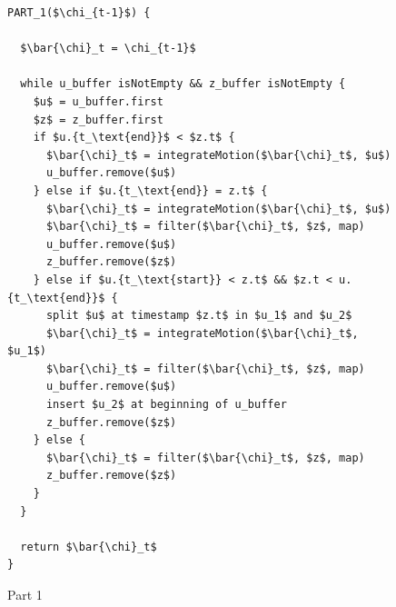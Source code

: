 \begin{figure}
\begin{lstlisting}[mathescape]
PART_1($\chi_{t-1}$) {

  $\bar{\chi}_t = \chi_{t-1}$

  while u_buffer isNotEmpty && z_buffer isNotEmpty {
    $u$ = u_buffer.first
    $z$ = z_buffer.first
    if $u.{t_\text{end}}$ < $z.t$ {
      $\bar{\chi}_t$ = integrateMotion($\bar{\chi}_t$, $u$)
      u_buffer.remove($u$)
    } else if $u.{t_\text{end}} = z.t$ {
      $\bar{\chi}_t$ = integrateMotion($\bar{\chi}_t$, $u$)
      $\bar{\chi}_t$ = filter($\bar{\chi}_t$, $z$, map)
      u_buffer.remove($u$)
      z_buffer.remove($z$)
    } else if $u.{t_\text{start}} < z.t$ && $z.t < u.{t_\text{end}}$ {
      split $u$ at timestamp $z.t$ in $u_1$ and $u_2$
      $\bar{\chi}_t$ = integrateMotion($\bar{\chi}_t$, $u_1$)
      $\bar{\chi}_t$ = filter($\bar{\chi}_t$, $z$, map)
      u_buffer.remove($u$)
      insert $u_2$ at beginning of u_buffer
      z_buffer.remove($z$)
    } else {
      $\bar{\chi}_t$ = filter($\bar{\chi}_t$, $z$, map)
      z_buffer.remove($z$)
    }
  }
  
  return $\bar{\chi}_t$
}
\end{lstlisting}
\caption{Part 1}
\label{lst:algo_pf_1}
\end{figure}

